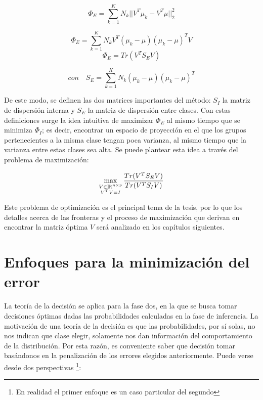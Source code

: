 $$ \Phi_{E} = \sum_{k=1}^{K} N_{k} || V^T \mu_k - V^T \mu ||^{2}_{2} $$
 
$$ \Phi_{E} =  \sum_{k=1}^{K} N_{k} V^T(\mu_k - \mu)(\mu_k - \mu)^T V $$
\begin{equation} \label{eq:24}
 \Phi_{E} =  Tr(V^T S_E V)  
\end{equation}

\begin{equation} \label{eq:25}
 con \quad S_E = \sum_{k=1}^{K} N_{k} (\mu_k - \mu)(\mu_k - \mu)^T 
\end{equation}

De este modo, se definen las dos matrices importantes del método: $S_I$ la matriz de dispersión interna y $S_E$ la matriz de dispersión entre clases. Con estas definiciones surge la idea intuitiva de maximizar $\Phi_{E}$ al mismo tiempo que se minimiza $\Phi_{I}$; es decir, encontrar un espacio de proyección en el que los grupos pertenecientes a la misma clase tengan poca varianza, al mismo tiempo que la varianza entre estas clases sea alta. Se puede plantear esta idea a través del problema de maximización:

\begin{equation}\label{eq:26}
	\max_{\substack{V \in {\rm I\!R}^{n\times p} \\ V^TV = I}} \frac{Tr(V^T S_E V)}{Tr(V^T S_I V)} 
\end{equation}

Este problema de optimización es el principal tema de la tesis, por lo que los detalles acerca de las fronteras y el proceso de maximización que derivan en encontrar la matriz óptima $V$ será analizado en los capítulos siguientes.

\section{Enfoques para la minimización del error}

La teoría de la decisión se aplica para la fase dos, en la que se busca tomar decisiones óptimas dadas las probabilidades calculadas en la fase de inferencia. La motivación de una teoría de la decisión es que las probabilidades, por sí solas, no nos indican que clase elegir, solamente nos dan información del comportamiento de la distribución. Por esta razón, es conveniente saber que decisión tomar basándonos en la penalización de los errores elegidos anteriormente. Puede verse desde dos perspectivas \footnote{En realidad el primer enfoque es un caso particular del segundo}:


